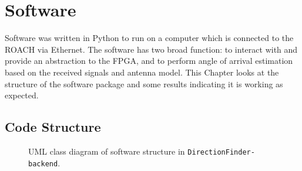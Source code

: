 \chapter{Software}
\label{ch:software-design}
\graphicspath{{./img/software/}}
Software was written in Python to run on a computer which is connected to the ROACH via Ethernet. The software has two broad function: to interact with and provide an abstraction to the FPGA, and to perform angle of arrival estimation based on the received signals and antenna model. This Chapter looks at the structure of the software package and some results indicating it is working as expected.

\section{Code Structure}
\begin{figure}
  \centering
  \caption{UML class diagram of software structure in \lstinline{DirectionFinder-backend}.}
  \label{fig:software:df-backend-uml}
\end{figure}
